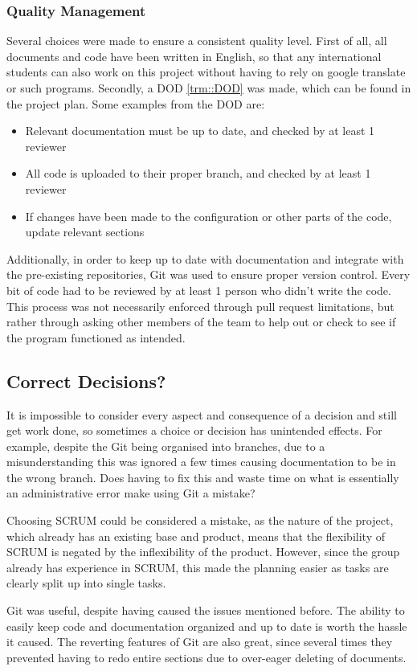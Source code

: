 \subsubsection{Quality Management}
Several choices were made to ensure a consistent quality level.
First of all, all documents and code have been written in English, so that any international students can also work on this project without having to rely on google translate or such programs.
Secondly, a DOD \ref{trm::DOD} was made, which can be found in the project plan.
Some examples from the DOD are:
\begin{itemize}
\item Relevant documentation must be up to date, and checked by at least 1 reviewer
\item All code is uploaded to their proper branch, and checked by at least 1 reviewer
\item If changes have been made to the configuration or other parts of the code, update relevant sections
\end{itemize}
Additionally, in order to keep up to date with documentation and integrate with the pre-existing repositories, Git was used to ensure proper version control.
Every bit of code had to be reviewed by at least 1 person who didn't write the code.
This process was not necessarily enforced through pull request limitations, but rather through asking other members of the team to help out or check to see if the program functioned as intended.

\subsection{Correct Decisions?}
It is impossible to consider every aspect and consequence of a decision and still get work done, so sometimes a choice or decision has unintended effects. 
For example, despite the Git being organised into branches, due to a misunderstanding this was ignored a few times causing documentation to be in the wrong branch.
Does having to fix this and waste time on what is essentially an administrative error make using Git a mistake?

Choosing SCRUM could be considered a mistake, as the nature of the project, which already has an existing base and product, means that the flexibility of SCRUM is negated by the inflexibility of the product.
However, since the group already has experience in SCRUM, this made the planning easier as tasks are clearly split up into single tasks.

Git was useful, despite having caused the issues mentioned before.
The ability to easily keep code and documentation organized and up to date is worth the hassle it caused.
The reverting features of Git are also great, since several times they prevented having to redo entire sections due to over-eager deleting of documents.

\newpage
